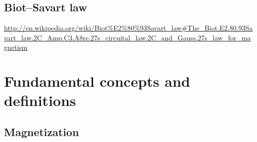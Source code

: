 \subsection{Biot--Savart law}

\url{http://en.wikipedia.org/wiki/Biot\%E2\%80\%93Savart_law\#The_Biot.E2.80.93Savart_law.2C_Amp.C3.A8re.27s_circuital_law.2C_and_Gauss.27s_law_for_magnetism}


\section{Fundamental concepts and definitions}

\subsection{Magnetization}
